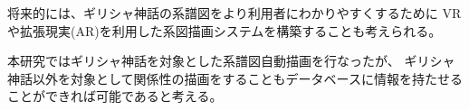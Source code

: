 将来的には、ギリシャ神話の系譜図をより利用者にわかりやすくするために
VRや拡張現実(AR)を利用した系図描画システムを構築することも考えられる。

本研究ではギリシャ神話を対象とした系譜図自動描画を行なったが、
ギリシャ神話以外を対象として関係性の描画をすることもデータベースに情報を持たせることができれば可能であると考える。


